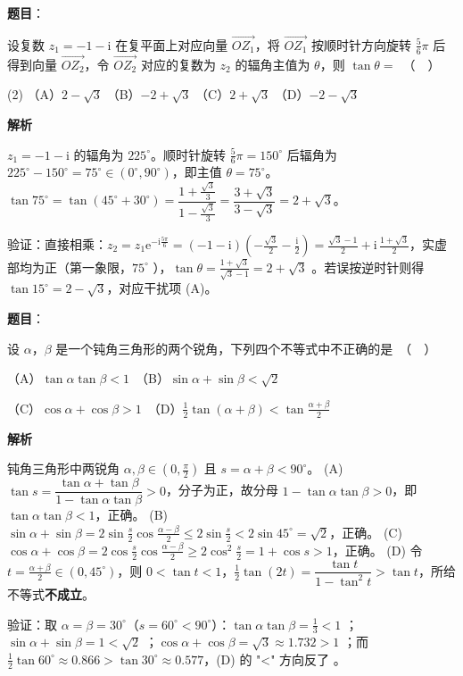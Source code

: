 \begin{answer}

\textbf{题目}：

设复数 $z_1 = -1 - \mathrm{i}$ 在复平面上对应向量 $\overrightarrow{OZ_1}$，将 $\overrightarrow{OZ_1}$ 按顺时针方向旋转 $\frac{5}{6}\pi$ 后得到向量 $\overrightarrow{OZ_2}$，令 $\overrightarrow{OZ_2}$ 对应的复数为 $z_2$ 的辐角主值为 $\theta$，则 $\tan\theta =$　（　）

\begin{gkopts}(2)
\task （A）$2 - \sqrt{3}$
\task （B）$-2 + \sqrt{3}$
\task （C）$2 + \sqrt{3}$
\task （D）$-2 - \sqrt{3}$
\end{gkopts}

\textbf{解析}

$z_1=-1-\mathrm i$ 的辐角为 $225^\circ$。顺时针旋转 $\frac56\pi=150^\circ$ 后辐角为 $225^\circ-150^\circ=75^\circ\in(0^\circ,90^\circ)$，即主值 $\theta=75^\circ$。
$\tan75^\circ=\tan(45^\circ+30^\circ)=\dfrac{1+\frac{\sqrt3}{3}}{1-\frac{\sqrt3}{3}}=\dfrac{3+\sqrt3}{3-\sqrt3}=2+\sqrt3$。

验证：直接相乘：$z_2=z_1\mathrm e^{-\mathrm i\frac{5\pi}{6}}=(-1-\mathrm i)\left(-\frac{\sqrt3}{2}-\frac{\mathrm i}{2}\right)=\frac{\sqrt3-1}{2}+\mathrm i\,\frac{1+\sqrt3}{2}$，实虚部均为正（第一象限，$75^\circ$ ），$\tan\theta=\frac{1+\sqrt3}{\sqrt3-1}=2+\sqrt3$ 。若误按逆时针则得 $\tan15^\circ=2-\sqrt3$，对应干扰项 (A)。


\end{answer}
\begin{answer}

\textbf{题目}：

设 $\alpha$，$\beta$ 是一个钝角三角形的两个锐角，下列四个不等式中不正确的是　（　）

（A）$\tan\alpha \tan\beta < 1$　（B）$\sin\alpha + \sin\beta < \sqrt{2}$

（C）$\cos\alpha + \cos\beta > 1$　（D）$\frac{1}{2}\tan(\alpha+\beta) < \tan\frac{\alpha+\beta}{2}$

\textbf{解析}

钝角三角形中两锐角 $\alpha,\beta\in(0,\frac\pi2)$ 且 $s=\alpha+\beta<90^\circ$。
(A) $\tan s=\dfrac{\tan\alpha+\tan\beta}{1-\tan\alpha\tan\beta}>0$，分子为正，故分母 $1-\tan\alpha\tan\beta>0$，即 $\tan\alpha\tan\beta<1$，正确。
(B) $\sin\alpha+\sin\beta=2\sin\frac s2\cos\frac{\alpha-\beta}{2}\le2\sin\frac s2<2\sin45^\circ=\sqrt2$，正确。
(C) $\cos\alpha+\cos\beta=2\cos\frac s2\cos\frac{\alpha-\beta}{2}\ge2\cos^2\frac s2=1+\cos s>1$，正确。
(D) 令 $t=\frac{\alpha+\beta}{2}\in(0,45^\circ)$，则 $0<\tan t<1$，$\frac12\tan(2t)=\dfrac{\tan t}{1-\tan^2 t}>\tan t$，所给不等式\textbf{不成立}。

验证：取 $\alpha=\beta=30^\circ$（$s=60^\circ<90^\circ$）：$\tan\alpha\tan\beta=\frac13<1$ ；$\sin\alpha+\sin\beta=1<\sqrt2$ ；$\cos\alpha+\cos\beta=\sqrt3\approx1.732>1$ ；而 $\frac12\tan60^\circ\approx0.866>\tan30^\circ\approx0.577$，(D) 的 "<" 方向反了 。


\end{answer}

